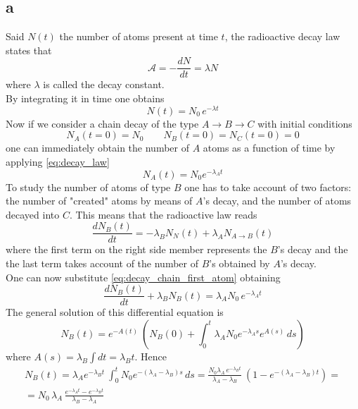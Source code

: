 \subsection*{a}
Said $N(t)$ the number of atoms present at time $t$, the radioactive decay law states that
\begin{equation}
    \mathcal{A} = -\frac{dN}{dt} = \lambda N
    \label{eq:decay_law}
\end{equation}
where $\lambda$ is called the decay constant. \\
By integrating it in time one obtains 
\begin{equation}
    N(t) = N_0 \, e^{-\lambda t}
    \label{eq:decay_chain_first_atom}
\end{equation}
Now if we consider a chain decay of the type $A \rightarrow B \rightarrow C$ with initial conditions 
\begin{equation*}
    N_A(t=0) = N_0 \qquad N_B(t=0) = N_C(t=0) = 0
\end{equation*}
one can immediately obtain the number of $A$ atoms as a function of time by applying \ref{eq:decay_law}
\begin{equation*}
    N_A(t) = N_0 e^{-\lambda_A t}
\end{equation*}
To study the number of atoms of type $B$ one has to take account of two factors: the number of "created" atoms by means of $A$'s decay, and
the number of atoms decayed into $C$. This means that the radioactive law reads 
\begin{equation*}
    \frac{dN_B(t)}{dt} = -\lambda_B N_N(t) + \lambda_A N_{A \to B}(t)
\end{equation*}
where the first term on the right side member represents the $B$'s decay and the the last term 
takes account of the number of $B$'s obtained by $A$'s decay. \\
One can now substitute \ref{eq:decay_chain_first_atom} obtaining 
\begin{equation*}
    \frac{dN_B(t)}{dt} + \lambda_B N_B(t) =  \lambda_A N_0 \, e^{-\lambda_A t}
\end{equation*}
The general solution of this differential equation is 
\begin{equation*}
    N_B(t) = e^{-A(t)} \ \left(N_B(0) + \int_0^t \lambda_A N_0 e^{-\lambda_A s} e^{A(s)} \, ds \right)
\end{equation*}
where $A(s) = \lambda_B \int dt = \lambda_B t$. Hence
\begin{gather*}
N_B(t) = \lambda_A e^{-\lambda_B t} \ \int_0^t N_0 e^{-(\lambda_A - \lambda_B) s} \, ds 
= \frac{N_0 \lambda_A \, e^{-\lambda_B t}}{\lambda_A - \lambda_B} \ \left(1 - e^{-(\lambda_A - \lambda_B) t}\right) = \\
= N_0 \, \lambda_A \, \frac{e^{-\lambda_A t} - e^{-\lambda_B t}}{\lambda_B - \lambda_A}
\end{gather*}

